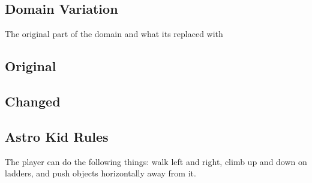 \begin{appendices}
\lstset{tabsize=2}

\section{Domain Variation}\label{Domain_Variation}
The original part of the domain and what its replaced with
\subsection{Original}\label{domain}

\subsection{Changed}\label{domain2}


\subsection{Astro Kid Rules}

The player can do the following things: walk left and right, climb up and down on ladders, and push objects horizontally away from it.

\end{appendices}